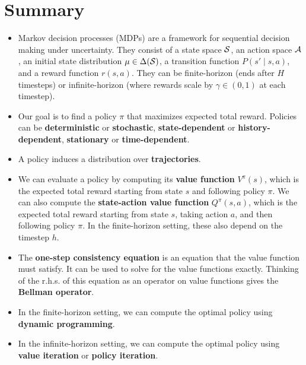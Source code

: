 \documentclass[\main/main]{subfiles}
\begin{document}
\section{Summary}

\begin{itemize}
    \item Markov decision processes (MDPs) are a framework for sequential decision making under uncertainty. They consist of a state space $\S$, an action space $\A$, an initial state distribution $\mu \in \Delta(\S)$, a transition function $P(s' \mid s, a)$, and a reward function $r(s, a)$. They can be finite-horizon (ends after $H$ timesteps) or infinite-horizon (where rewards scale by $\gamma \in (0, 1)$ at each timestep).
    \item Our goal is to find a policy $\pi$ that maximizes expected total reward. Policies can be \textbf{deterministic} or \textbf{stochastic}, \textbf{state-dependent} or \textbf{history-dependent}, \textbf{stationary} or \textbf{time-dependent}.
    \item A policy induces a distribution over \textbf{trajectories}.
    \item We can evaluate a policy by computing its \textbf{value function} $V^\pi(s)$, which is the expected total reward starting from state $s$ and following policy $\pi$. We can also compute the \textbf{state-action value function} $Q^\pi(s, a)$, which is the expected total reward starting from state $s$, taking action $a$, and then following policy $\pi$. In the finite-horizon setting, these also depend on the timestep $h$.
    \item The \textbf{one-step consistency equation} is an equation that the value function must satisfy. It can be used to solve for the value functions exactly. Thinking of the r.h.s. of this equation as an operator on value functions gives the \textbf{Bellman operator}.
    \item In the finite-horizon setting, we can compute the optimal policy using \textbf{dynamic programming}.
    \item In the infinite-horizon setting, we can compute the optimal policy using \textbf{value iteration} or \textbf{policy iteration}.
\end{itemize}
\end{document}
